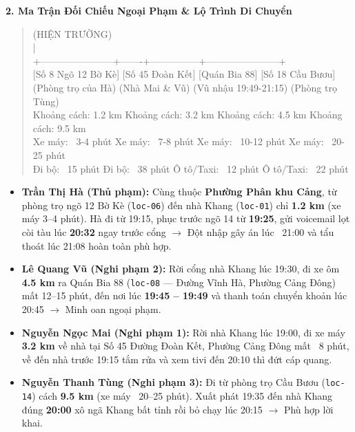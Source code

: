 \documentclass[12pt,a4paper]{article}
\begin{document}
\vspace{0.2cm}



\vspace{0.3cm}\noindent\textbf{\large 2. Ma Trận Đối Chiếu Ngoại Phạm \& Lộ Trình Di Chuyển}\\[0.15cm]



\begin{quote}
\fontsize{9pt}{11pt}\selectfont\ttfamily
                                [SỐ 14 BỜ SÔNG] (HIỆN TRƯỜNG)\\
                                       |\\
       +-----------------------+-------+---------------+-----------------------+\\
\vspace{0.2cm}
 [Số 8 Ngõ 12 Bờ Kè]   [Số 45 Đoàn Kết]        [Quán Bia 88]        [Số 18 Cầu Bươu]\\
 (Phòng trọ của Hà)    (Nhà Mai \& Vũ)          (Vũ nhậu 19:49-21:15) (Phòng trọ Tùng)\\
   Khoảng cách: 1.2 km   Khoảng cách: 3.2 km     Khoảng cách: 4.5 km   Khoảng cách: 9.5 km\\
   Xe máy: ~3-4 phút     Xe máy: ~7-8 phút       Xe máy: ~10-12 phút   Xe máy: ~20-25 phút\\
   Đi bộ: ~15 phút       Đi bộ: ~38 phút         Ô tô/Taxi: ~12 phút   Ô tô/Taxi: ~22 phút\\
\end{quote}


\begin{itemize}[leftmargin=*, itemsep=2pt, topsep=2pt, parsep=0pt]
  \item \textbf{Trần Thị Hà (Thủ phạm):} Cùng thuộc \textbf{Phường Phân khu Cảng}, từ phòng trọ ngõ 12 Bờ Kè (\texttt{loc-06}) đến nhà Khang (\texttt{loc-01}) chỉ \textbf{1.2 km} (xe máy 3–4 phút). Hà đi từ 19:15, phục trước ngõ 14 từ \textbf{19:25}, gửi voicemail lọt còi tàu lúc \textbf{20:32} ngay trước cổng $\rightarrow$ Đột nhập gây án lúc ~21:00 và tẩu thoát lúc 21:08 hoàn toàn phù hợp.
  \item \textbf{Lê Quang Vũ (Nghi phạm 2):} Rời cổng nhà Khang lúc 19:30, đi xe ôm \textbf{4.5 km} ra Quán Bia 88 (\texttt{loc-08} — Đường Vĩnh Hà, Phường Cảng Đông) mất 12–15 phút, đến nơi lúc \textbf{19:45 – 19:49} và thanh toán chuyển khoản lúc 20:45 $\rightarrow$ Minh oan ngoại phạm.
  \item \textbf{Nguyễn Ngọc Mai (Nghi phạm 1):} Rời nhà Khang lúc 19:00, đi xe máy \textbf{3.2 km} về nhà tại Số 45 Đường Đoàn Kết, Phường Cảng Đông mất ~8 phút, về đến nhà trước 19:15 tắm rửa và xem tivi đến 20:10 thì đứt cáp quang.
  \item \textbf{Nguyễn Thanh Tùng (Nghi phạm 3):} Đi từ phòng trọ Cầu Bươu (\texttt{loc-14}) cách \textbf{9.5 km} (xe máy ~20–25 phút). Xuất phát 19:35 đến nhà Khang đúng \textbf{20:00} xô ngã Khang bất tỉnh rồi bỏ chạy lúc 20:15 $\rightarrow$ Phù hợp lời khai.


\end{itemize}
\end{document}
